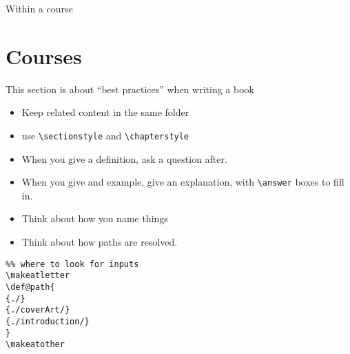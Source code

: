 \documentclass{ximera}
\begin{document}
Within a course







    \section{Courses}

    This section is about ``best practices'' when writing a book
    \begin{itemize}
      \item Keep related content in the same folder
      \item use \texttt{\textbackslash sectionstyle} and
            \texttt{\textbackslash chapterstyle}
      \item When you give a definition, ask a question after.
      \item When you give and example, give an explanation, with
            \texttt{\textbackslash answer} boxes to fill in.
      \item Think about how you name things
      \item Think about how paths are resolved.
    \end{itemize}

    \begin{verbatim}
%% where to look for inputs
\makeatletter
\def@path{
{./}
{./coverArt/}
{./introduction/}
}
\makeatother
\end{verbatim}
    \pdfOnly{\end{multicols}}
\end{document}
